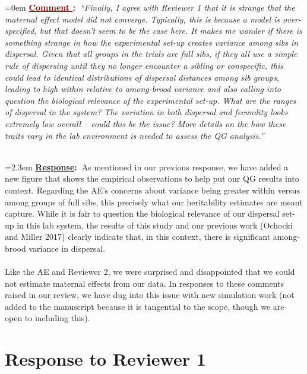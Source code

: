 \documentclass[12pt]{article}
\newcounter{cN}
\newcommand{\comment}[1]{
	\vspace{2em}
	\refstepcounter{cN} %
	\noindent \hangindent=0em \textbf{\textcolor{Maroon}{\uline{Comment \thecN}:~}}\emph{``#1''}
	}
\newcommand{\response}[1]{
	\\[0.25em]
	\hangindent=2.3em \textbf{\textcolor{NavyBlue}{\uline{Response}:~}}#1
	}
\newcommand{\revise}[1]{{\color{Mahogany}{#1}}}
\begin{document}
\comment{Finally, I agree with Reviewer 1 that it is strange that the maternal effect model did not converge.
Typically, this is because a model is over-specified, but that doesn’t seem to be the case here.
It makes me wonder if there is something strange in how the experimental set-up creates variance among sibs in dispersal.
Given that all groups in the trials are full sibs, if they all use a simple rule of dispersing until they no longer encounter a sibling or conspecific, this could lead to identical distributions of dispersal distances among sib groups, leading to high within relative to among-brood variance and also calling into question the biological relevance of the experimental set-up.
What are the ranges of dispersal in the system? The variation in both dispersal and fecundity looks extremely low overall – could this be the issue?
More details on the how these traits vary in the lab environment is needed to assess the QG analysis.}
\response{As mentioned in our previous response, we have added a new figure that shows the empirical observations to help put our QG results into context.
Regarding the AE's concerns about variance being greater within versus among groups of full sibs, this precisely what our heritability estimates are meant capture.
While it is fair to question the biological relevance of our dispersal set-up in this lab system, the results of this study and our previous work (Ochocki and Miller 2017) clearly indicate that, in this context, there is significant among-brood variance in dispersal. \\
\\
Like the AE and Reviewer 2, we were surprised and disappointed that we could not estimate maternal effects from our data.
In responses to these comments raised in our review, we have dug into this issue with new simulation work (not added to the manuscript because it is tangential to the scope, though we are open to including this).
\revise{Summarise findings.}
}

\section{Response to Reviewer 1}
\vspace{-2em}
\end{document}
